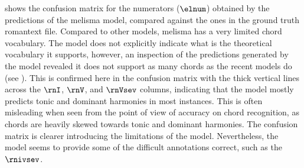 

 shows the confusion matrix
for the numerators ($\elnum$) obtained by the predictions of
the \gls{melisma} model, compared against the ones in the
ground truth \gls{romantext} file. Compared to other models,
\gls{melisma} has a very limited chord vocabulary. The model
does not explicitly indicate what is the theoretical
vocabulary it supports, however, an inspection of the
predictions generated by the model revealed it does not
support as many chords as the recent models do (see
). This is confirmed here in the
confusion matrix with the thick vertical lines across the
$\rnI$, $\rnV$, and $\rnVsev$ columns, indicating that the
model mostly predicts tonic and dominant harmonies in most
instances. This is often misleading when seen from the point
of view of accuracy on chord recognition, as chords are
heavily skewed towards tonic and dominant harmonies. The
confusion matrix is clearer introducing the limitations of
the model. Nevertheless, the model seems to provide some of
the difficult annotations correct, such as the $\rnivsev$.



